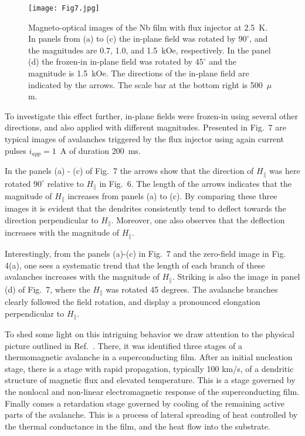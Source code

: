 \documentclass[superscriptaddress,twocolumn,aps,
showpacs]{revtex4-1}
\begin{document}
\begin{figure}[b]
  \centering
  \texttt{[image: Fig7.jpg]}
  \label{ava-direction}
  \caption{Magneto-optical images of the Nb film with flux injector at 2.5~K.
  In panels from (a) to (c) the in-plane field was rotated by ${90}^{\circ}$, and the magnitudes are 0.7, 1.0, and 1.5~kOe, respectively.
  In the panel (d) the frozen-in in-plane field was rotated by ${45}^{\circ}$ and the magnitude is 1.5~kOe.
  The directions of the in-plane field are indicated by the arrows.
  The scale bar at the bottom right is 500~$\mu$m.
   }
\end{figure}

To investigate this effect further, in-plane fields  were frozen-in  using several other directions, and also applied with different magnitudes. Presented in Fig.~7 are typical images of avalanches triggered by the flux injector using again current pulses $i_{app} = 1$~A of duration 200~ms. 

In the panels  (a) - (c) of Fig.~7 the arrows show that the direction of  $H_{\parallel}$ was here rotated ${90}^{\circ}$ relative to $H_{\parallel}$ in Fig.~6. The length of the arrows indicates that the magnitude of $H_{\parallel}$ increases from panels (a) to (c).
By comparing these three images it is evident that the dendrites consistently tend to deflect towards the direction perpendicular to $H_{\parallel}$. 
 Moreover, one also observes that the deflection increases with the  magnitude of $H_{\parallel}$.
 
Interestingly, from the panels (a)-(c) in Fig.~7  and the zero-field image in Fig. 4(a), one sees a systematic trend that the length of each branch of these avalanches increases with the magnitude of  $H_{\parallel}$. 
Striking is also the image in panel (d) of Fig.~7, where the  $H_{\parallel}$ was rotated 45 degrees.
The avalanche branches clearly followed the field rotation, and display a pronounced elongation perpendicular to  $H_{\parallel}$. 

To shed some light on this  intriguing behavior we draw attention to the physical picture outlined in Ref.~. 
There, it was identified three stages of a thermomagnetic avalanche in a superconducting film.
After an initial nucleation stage, there is a stage with rapid propagation, typically 100 km/s, \cite{Bolz2003, Vestgarden12} of a dendritic structure of magnetic flux and elevated temperature.
This is a stage governed by the nonlocal and non-linear electromagnetic response of the superconducting film.
Finally comes a retardation stage governed by cooling of the remaining active parts of the avalanche.
This is a process of lateral spreading of heat controlled by the thermal conductance in the film, and the heat flow into the substrate. 
\end{document}
